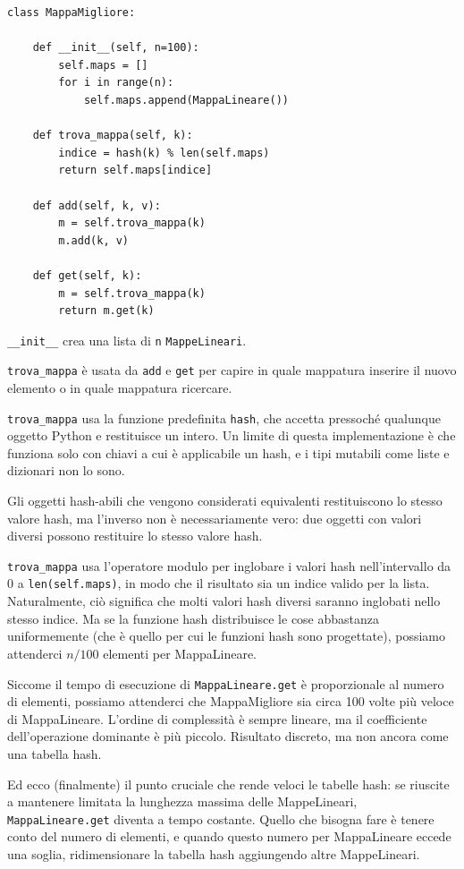\documentclass[10pt]{book}
\begin{document}
\begin{verbatim}
class MappaMigliore:

    def __init__(self, n=100):
        self.maps = []
        for i in range(n):
            self.maps.append(MappaLineare())

    def trova_mappa(self, k):
        indice = hash(k) % len(self.maps)
        return self.maps[indice]

    def add(self, k, v):
        m = self.trova_mappa(k)
        m.add(k, v)

    def get(self, k):
        m = self.trova_mappa(k)
        return m.get(k)
\end{verbatim}

\verb"__init__" crea una lista di {\tt n} {\tt MappeLineari}.

\verb"trova_mappa" è usata da
{\tt add} e {\tt get} per capire in quale mappatura inserire il nuovo elemento o in quale mappatura ricercare.

\verb"trova_mappa" usa la funzione predefinita {\tt hash}, che accetta pressoché qualunque oggetto Python e restituisce un intero. Un limite di questa implementazione è che funziona solo con chiavi a cui è applicabile un hash, e i tipi mutabili come liste e dizionari non lo sono.

Gli oggetti hash-abili che vengono considerati equivalenti restituiscono lo stesso valore hash, ma l'inverso non è necessariamente vero: due oggetti con valori diversi possono restituire lo stesso valore hash.

\verb"trova_mappa" usa l'operatore modulo per inglobare i valori hash nell'intervallo da 0 a {\tt len(self.maps)}, in modo che il risultato sia un indice valido per la lista. Naturalmente, ciò significa che molti valori hash diversi saranno inglobati nello stesso indice. Ma se la funzione hash distribuisce le cose abbastanza uniformemente (che è quello per cui le funzioni hash sono progettate), possiamo attenderci $n/100$ elementi per MappaLineare.

Siccome il tempo di esecuzione di {\tt MappaLineare.get} è proporzionale al numero di elementi, possiamo attenderci che MappaMigliore sia circa 100 volte più veloce di MappaLineare. L'ordine di complessità è sempre lineare, ma il coefficiente dell'operazione dominante è più piccolo. Risultato discreto, ma non ancora come una tabella hash.

Ed ecco (finalmente) il punto cruciale che rende veloci le tabelle hash: se riuscite a mantenere limitata la lunghezza massima delle MappeLineari, {\tt
  MappaLineare.get} diventa a tempo costante.  Quello che bisogna fare è tenere conto del numero di elementi, e quando questo numero per MappaLineare eccede una soglia, ridimensionare la tabella hash aggiungendo altre MappeLineari.
\end{document}

